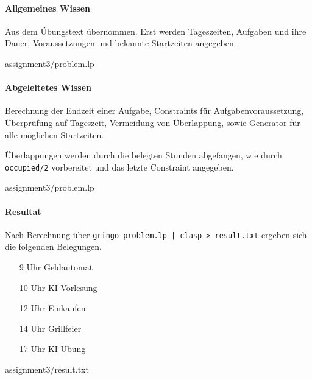 
\paragraph{Allgemeines Wissen} Aus dem Übungstext übernommen. Erst werden Tageszeiten, Aufgaben und ihre Dauer, Voraussetzungen und bekannte Startzeiten angegeben.


{assignment3/problem.lp}


\paragraph{Abgeleitetes Wissen} Berechnung der Endzeit einer Aufgabe, Constraints für Aufgabenvoraussetzung, Überprüfung auf Tageszeit, Vermeidung von Überlappung, sowie Generator für alle möglichen Startzeiten.

Überlappungen werden durch die belegten Stunden abgefangen, wie durch \lstinline+occupied/2+ vorbereitet und das letzte Constraint angegeben.

%
{assignment3/problem.lp}

\paragraph{Resultat} Nach Berechnung über \lstinline+gringo problem.lp | clasp > result.txt+ ergeben sich die folgenden Belegungen.

\begin{enumerate}
	\item[\footnotesize 9 Uhr] Geldautomat
	\item[\footnotesize 10 Uhr] KI-Vorlesung
	\item[\footnotesize 12 Uhr] Einkaufen
	\item[\footnotesize 14 Uhr] Grillfeier
	\item[\footnotesize 17 Uhr] KI-Übung
\end{enumerate}


{assignment3/result.txt}